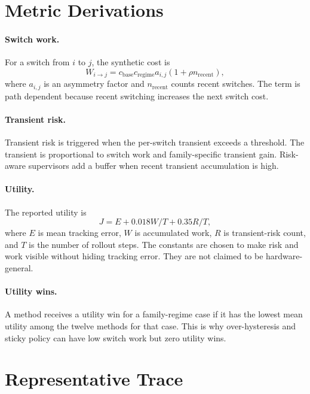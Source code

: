 \documentclass{article}
\begin{document}
\section{Metric Derivations}

\paragraph{Switch work.}
For a switch from $i$ to $j$, the synthetic cost is
\begin{equation}
    W_{i\rightarrow j}
    =
    c_{\mathrm{base}}
    c_{\mathrm{regime}}
    a_{i,j}
    (1+\rho n_{\mathrm{recent}}),
\end{equation}
where $a_{i,j}$ is an asymmetry factor and $n_{\mathrm{recent}}$ counts recent switches.
The term is path dependent because recent switching increases the next switch cost.

\paragraph{Transient risk.}
Transient risk is triggered when the per-switch transient exceeds a threshold.
The transient is proportional to switch work and family-specific transient gain.
Risk-aware supervisors add a buffer when recent transient accumulation is high.

\paragraph{Utility.}
The reported utility is
\begin{equation}
    J = E + 0.018 W/T + 0.35 R/T,
\end{equation}
where $E$ is mean tracking error, $W$ is accumulated work, $R$ is transient-risk count, and $T$ is the number of rollout steps.
The constants are chosen to make risk and work visible without hiding tracking error.
They are not claimed to be hardware-general.

\paragraph{Utility wins.}
A method receives a utility win for a family-regime case if it has the lowest mean utility among the twelve methods for that case.
This is why over-hysteresis and sticky policy can have low switch work but zero utility wins.

\section{Representative Trace}
\end{document}
